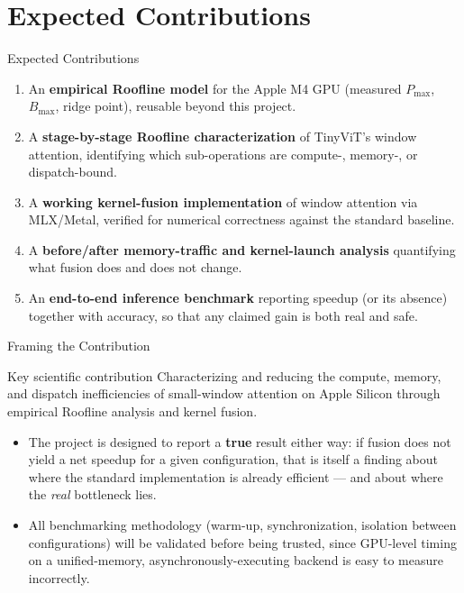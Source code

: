 \documentclass[aspectratio=169]{beamer}
\begin{document}
\section{Expected Contributions}

\begin{frame}{Expected Contributions}
  \begin{enumerate}
    \item An \textbf{empirical Roofline model} for the Apple M4 GPU (measured $P_{\max}$,
      $B_{\max}$, ridge point), reusable beyond this project.
    \item A \textbf{stage-by-stage Roofline characterization} of TinyViT's window attention,
      identifying which sub-operations are compute-, memory-, or dispatch-bound.
    \item A \textbf{working kernel-fusion implementation} of window attention via MLX/Metal,
      verified for numerical correctness against the standard baseline.
    \item A \textbf{before/after memory-traffic and kernel-launch analysis} quantifying what
      fusion does and does not change.
    \item An \textbf{end-to-end inference benchmark} reporting speedup (or its absence) together
      with accuracy, so that any claimed gain is both real and safe.
  \end{enumerate}
\end{frame}

\begin{frame}{Framing the Contribution}
  \begin{block}{Key scientific contribution}
    \centering
    Characterizing and reducing the compute, memory, and dispatch inefficiencies of small-window
    attention on Apple Silicon through empirical Roofline analysis and kernel fusion.
  \end{block}
  \vspace{4mm}
  \begin{itemize}
    \item The project is designed to report a \textbf{true} result either way: if fusion does
      not yield a net speedup for a given configuration, that is itself a finding about where the
      standard implementation is already efficient --- and about where the \emph{real} bottleneck
      lies.
    \item All benchmarking methodology (warm-up, synchronization, isolation between
      configurations) will be validated before being trusted, since GPU-level timing on a
      unified-memory, asynchronously-executing backend is easy to measure incorrectly.
  \end{itemize}
\end{frame}
\end{document}
